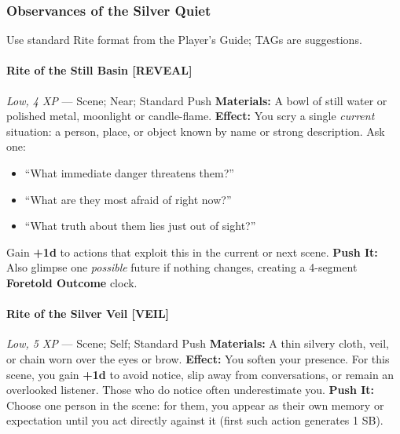 \documentclass[11pt]{book}
\begin{document}
\subsubsection{Observances of the Silver Quiet}

Use standard Rite format from the Player's Guide; TAGs are suggestions.

\paragraph{Rite of the Still Basin [REVEAL]}
\emph{Low, 4 XP} --- Scene; Near; Standard Push  
\textbf{Materials:} A bowl of still water or polished metal, moonlight or candle-flame.  
\textbf{Effect:} You scry a single \emph{current} situation: a person, place, or object known by name or strong description. Ask one:
\begin{itemize}[leftmargin=*]
  \item ``What immediate danger threatens them?''
  \item ``What are they most afraid of right now?''
  \item ``What truth about them lies just out of sight?''
\end{itemize}
Gain \textbf{+1d} to actions that exploit this in the current or next scene.  
\textbf{Push It:} Also glimpse one \emph{possible} future if nothing changes, creating a 4-segment \textbf{Foretold Outcome} clock.

\paragraph{Rite of the Silver Veil [VEIL]}
\emph{Low, 5 XP} --- Scene; Self; Standard Push  
\textbf{Materials:} A thin silvery cloth, veil, or chain worn over the eyes or brow.  
\textbf{Effect:} You soften your presence. For this scene, you gain \textbf{+1d} to avoid notice, slip away from conversations, or remain an overlooked listener. Those who do notice often underestimate you.  
\textbf{Push It:} Choose one person in the scene: for them, you appear as their own memory or expectation until you act directly against it (first such action generates 1 SB).
\end{document}
